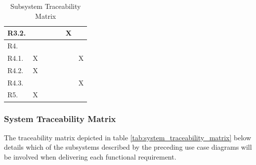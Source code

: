 \begin{table}[H]
\begin{tabular}{|l|c|c|c|c|c|c|}
R3.2.   &     &     &     &     & X   &     \\ \hline
R4.     &     &     &     &     &     &     \\ \hline
R4.1.   & X   &     &     &     &     & X   \\ \hline
R4.2.   & X   &     &     &     &     &     \\ \hline
R4.3.   &     &     &     &     &     & X   \\ \hline
R5.     & X   &     &     &     &     &     \\ \hline
\end{tabular}
\caption{Subsystem Traceability Matrix}
\label{tab:subsystem_traceability_matrix}
\end{table}

\newpage

\subsubsection{System Traceability Matrix}
The traceability matrix depicted in table \ref{tab:system_traceability_matrix} below details which of the subsystems described by the preceding use case diagrams will be involved when delivering each functional requirement.

